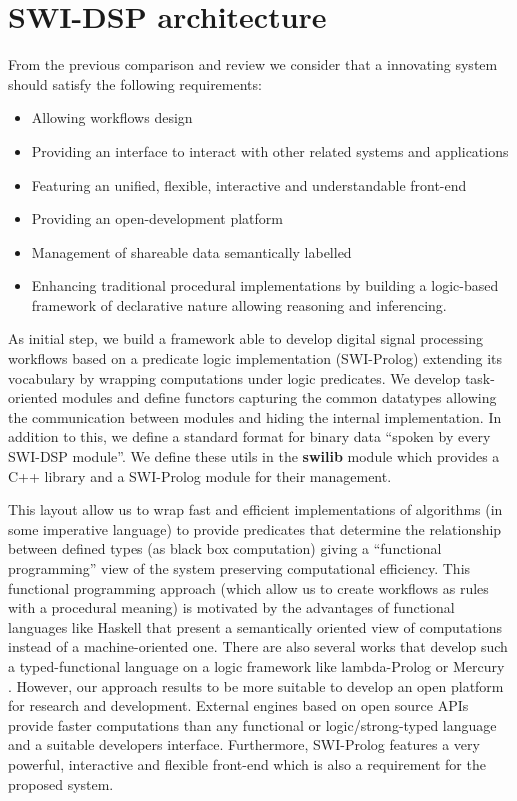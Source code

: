 \documentclass[runningheads]{llncs}
\begin{document}
\section{SWI-DSP architecture}\label{sec:architecture}

From the previous comparison and review we consider that a innovating system should satisfy the following requirements:

\begin{itemize}
 \item Allowing workflows design
 \item Providing an interface to interact with other related systems and applications
 \item Featuring an unified, flexible, interactive and understandable front-end
 \item Providing an open-development platform
 \item Management of shareable data semantically labelled
 \item Enhancing traditional procedural implementations by building a logic-based framework of declarative nature allowing reasoning and inferencing.
\end{itemize}

As initial step, we build a framework able to develop digital signal processing workflows based on a predicate logic implementation (SWI-Prolog) extending its vocabulary by wrapping computations under logic predicates. We develop task-oriented modules and define functors capturing the common datatypes allowing the communication between modules and hiding the internal implementation. In addition to this, we define a standard format for binary data ``spoken by every SWI-DSP module''. We define these utils in the \textbf{swilib} module which provides a C++ library and a SWI-Prolog module for their management.

This layout allow us to wrap fast and efficient implementations of algorithms (in some imperative language) to provide predicates that determine the relationship between defined types (as black box computation) giving a ``functional programming'' view of the system preserving computational efficiency. This functional programming approach (which allow us to create workflows as rules with a procedural meaning) is motivated by the advantages of functional languages like Haskell \cite{haskell} that present a semantically oriented view of computations instead of a machine-oriented one. There are also several works that develop such a typed-functional language on a logic framework like lambda-Prolog \cite{lambda} or Mercury \cite{mercury}. However, our approach results to be more suitable to develop an open platform for research and development. External engines based on open source APIs provide faster computations than any functional or logic/strong-typed language and a suitable developers interface. Furthermore, SWI-Prolog features a very powerful, interactive and flexible front-end which is also a requirement for the proposed system.
\end{document}
